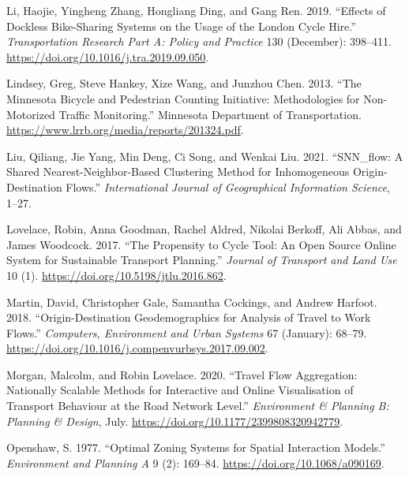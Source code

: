 \documentclass[
]{article}
\newlength{\cslhangindent}
\newlength{\cslentryspacingunit} %
\newenvironment{CSLReferences}[2] %
 {%
  \setlength{\parindent}{0pt}
  \ifodd #1
  \let\oldpar\par
  \def\par{\hangindent=\cslhangindent\oldpar}
  \fi
  \setlength{\parskip}{#2\cslentryspacingunit}
 }%
 {}
\begin{document}
\begin{CSLReferences}{1}{0}
\leavevmode{}%
Li, Haojie, Yingheng Zhang, Hongliang Ding, and Gang Ren. 2019. {``Effects of Dockless Bike-Sharing Systems on the Usage of the {London Cycle Hire}.''} \emph{Transportation Research Part A: Policy and Practice} 130 (December): 398--411. \url{https://doi.org/10.1016/j.tra.2019.09.050}.

\leavevmode{}%
Lindsey, Greg, Steve Hankey, Xize Wang, and Junzhou Chen. 2013. {``The {Minnesota} Bicycle and Pedestrian Counting Initiative: {Methodologies} for Non-Motorized Traffic Monitoring.''} {Minnesota Department of Transportation}. \url{https://www.lrrb.org/media/reports/201324.pdf}.

\leavevmode{}%
Liu, Qiliang, Jie Yang, Min Deng, Ci Song, and Wenkai Liu. 2021. {``{SNN}\_flow: A Shared Nearest-Neighbor-Based Clustering Method for Inhomogeneous Origin-Destination Flows.''} \emph{International Journal of Geographical Information Science}, 1--27.

\leavevmode{}%
Lovelace, Robin, Anna Goodman, Rachel Aldred, Nikolai Berkoff, Ali Abbas, and James Woodcock. 2017. {``The {Propensity} to {Cycle Tool}: {An} Open Source Online System for Sustainable Transport Planning.''} \emph{Journal of Transport and Land Use} 10 (1). \url{https://doi.org/10.5198/jtlu.2016.862}.

\leavevmode{}%
Martin, David, Christopher Gale, Samantha Cockings, and Andrew Harfoot. 2018. {``Origin-Destination Geodemographics for Analysis of Travel to Work Flows.''} \emph{Computers, Environment and Urban Systems} 67 (January): 68--79. \url{https://doi.org/10.1016/j.compenvurbsys.2017.09.002}.

\leavevmode{}%
Morgan, Malcolm, and Robin Lovelace. 2020. {``Travel Flow Aggregation: Nationally Scalable Methods for Interactive and Online Visualisation of Transport Behaviour at the Road Network Level.''} \emph{Environment \& Planning B: Planning \& Design}, July. \url{https://doi.org/10.1177/2399808320942779}.

\leavevmode{}%
Openshaw, S. 1977. {``Optimal Zoning Systems for Spatial Interaction Models.''} \emph{Environment and Planning A} 9 (2): 169--84. \url{https://doi.org/10.1068/a090169}.


\end{CSLReferences}
\end{document}

